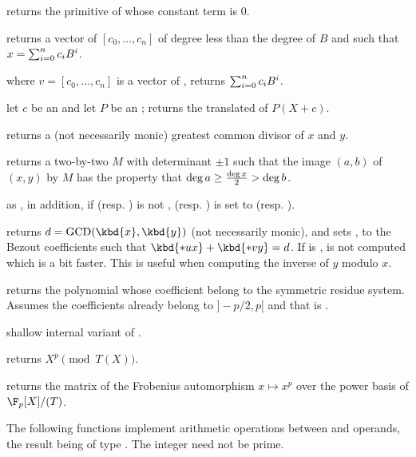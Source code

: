  returns the primitive of  whose
constant term is $0$.

 returns a vector of 
$[c_0,\ldots,c_n]$ of degree less than the degree of $B$ and such that
$x=\sum_{i=0}^{n}{c_i\*B^i}$.

 where $v=[c_0,\ldots,c_n]$
is a vector of , returns $\sum_{i=0}^{n}{c_i\*B^i}$.

 let $c$ be an  and let
$P$ be an ; returns the translated  of $P(X+c)$.

 returns a (not necessarily monic)
greatest common divisor of $x$  and $y$.

 returns a two-by-two 
$M$ with determinant $\pm 1$ such that the image $(a,b)$ of $(x,y)$ by $M$
has the property that $\deg a \geq {\deg x \over 2} > \deg b$.

as , in addition, if  (resp. ) is not
,  (resp. )
is set to  (resp. ).

 returns
$d = \text{GCD}(\kbd{x},\kbd{y})$ (not necessarily monic), and sets ,
 to the Bezout coefficients such that $\kbd{*ux} + \kbd{*vy} = d$.
If  is ,  is not computed which is a bit faster.
This is useful when computing the inverse of $y$ modulo $x$.

 returns the polynomial whose
coefficient belong to the symmetric residue system. Assumes the coefficients
already belong to $]-p/2, p[$ and that  is .

 shallow internal variant of
.

 returns $X^{p}\pmod{T(X)}$.

 returns the matrix of the
Frobenius automorphism $x\mapsto x^p$ over the power basis of $\F_p[X]/(T)$.

The following functions implement arithmetic operations between 
and  operands, the result being of type . The integer
 need not be prime.


